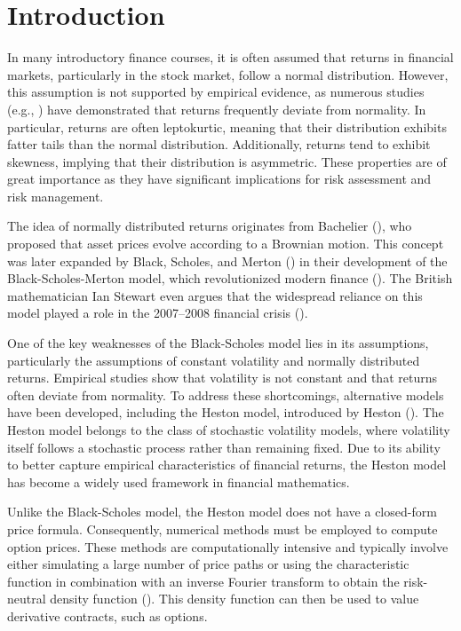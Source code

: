 \chapter{Introduction}
\label{sec:introduction}

In many introductory finance courses, it is often assumed that returns in financial markets, particularly in the stock market, follow a normal distribution. However, this assumption is not supported by empirical evidence, as numerous studies (e.g., \cite{mandelbrotVariationCertainSpeculative1997,hullValueRiskWhen1998,karoglouBreakingNonnormalityStock2010}) have demonstrated that returns frequently deviate from normality. In particular, returns are often leptokurtic, meaning that their distribution exhibits fatter tails than the normal distribution. Additionally, returns tend to exhibit skewness, implying that their distribution is asymmetric. These properties are of great importance as they have significant implications for risk assessment and risk management.

The idea of normally distributed returns originates from Bachelier (\citeyear{bachelierTheorySpeculation1900}), who proposed that asset prices evolve according to a Brownian motion. This concept was later expanded by Black, Scholes, and Merton (\citeyear{blackPricingOptionsCorporate1973}) in their development of the Black-Scholes-Merton model, which revolutionized modern finance (\cite{heimerGenesisBlackScholesOption2008}). The British mathematician Ian Stewart even argues that the widespread reliance on this model played a role in the 2007–2008 financial crisis (\cite{stewartPursuitUnknown172012}).

One of the key weaknesses of the Black-Scholes model lies in its assumptions, particularly the assumptions of constant volatility and normally distributed returns. Empirical studies show that volatility is not constant and that returns often deviate from normality. To address these shortcomings, alternative models have been developed, including the Heston model, introduced by Heston (\citeyear{hestonClosedFormSolutionOptions1993}). The Heston model belongs to the class of stochastic volatility models, where volatility itself follows a stochastic process rather than remaining fixed. Due to its ability to better capture empirical characteristics of financial returns, the Heston model has become a widely used framework in financial mathematics.

Unlike the Black-Scholes model, the Heston model does not have a closed-form price formula. Consequently, numerical methods must be employed to compute option prices. These methods are computationally intensive and typically involve either simulating a large number of price paths or using the characteristic function in combination with an inverse Fourier transform to obtain the risk-neutral density function (\cite{gatheralVolatilitySurfacePractitioner2011}). This density function can then be used to value derivative contracts, such as options.

